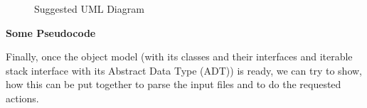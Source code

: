 \documentclass[11pt]{article}
\begin{document}
\begin{figure}[!htb]
\caption{\label{fig:ex06-uml-diagram} Suggested UML Diagram}
\end{figure}


\vspace{20pt}
{\bf \large Some Pseudocode}

Finally, once the object model (with its classes and their interfaces 
and iterable stack interface with its Abstract Data Type (ADT)) is ready, 
we can try to show, how this can be put together to parse the input files 
and to do the requested actions. 
\end{document}
